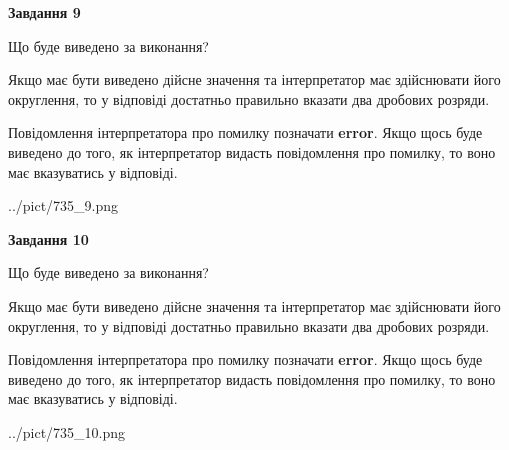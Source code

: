 \documentclass[12pt, ukrainian]{article}
\begin{document}
{\begin {Large}
{\begin {center}\textbf{Завдання 9}\end {center}}\par
Що буде виведено за виконання? \par

Якщо має бути виведено дійсне значення та інтерпретатор має здійснювати його округлення, 
то у відповіді достатньо правильно вказати два дробових розряди.

Повідомлення інтерпретатора про помилку позначати \textbf{error}.
Якщо щось буде виведено до того, як інтерпретатор видасть повідомлення про помилку, 
то воно має вказуватись у відповіді. \par

\begin{center}
	{../pict/735_9.png}
\end{center}
\newpage

{\begin {center}\textbf{Завдання 10}\end {center}}\par
Що буде виведено за виконання? \par

Якщо має бути виведено дійсне значення та інтерпретатор має здійснювати його округлення, 
то у відповіді достатньо правильно вказати два дробових розряди.

Повідомлення інтерпретатора про помилку позначати \textbf{error}.
Якщо щось буде виведено до того, як інтерпретатор видасть повідомлення про помилку, 
то воно має вказуватись у відповіді. \par

\begin{center}
	{../pict/735_10.png}
\end{center}
\newpage

\end {Large}}
\end{document}
